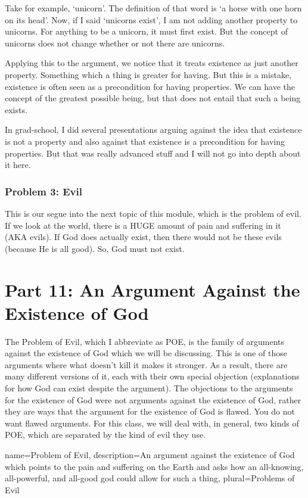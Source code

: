 Take for example, ‘unicorn’. The definition of that word is ‘a horse with one horn on its head’. Now, if I said ‘unicorns exist’, I am not adding another property to unicorns. For anything to be a unicorn, it must first exist. But the concept of unicorns does not change whether or not there are unicorns.

Applying this to the argument, we notice that it treats existence as just another property. Something which a thing is greater for having. But this is a mistake, existence is often seen as a precondition for having properties. We can have the concept of the greatest possible being, but that does not entail that such a being exists.

In grad-school, I did several presentations arguing against the idea that existence is not a property and also against that existence is a precondition for having properties. But that was really advanced stuff and I will not go into depth about it here.

\subsection{Problem 3: Evil}
This is our segue into the next topic of this module, which is the problem of evil. If we look at the world, there is a HUGE amount of pain and suffering in it (AKA evils). If God does actually exist, then there would not be these evils (because He is all good). So, God must not exist. 

\chapter{Part 11: An Argument Against the Existence of God}

The \gls{Problem of Evil}, which I abbreviate as POE, is the family of arguments against the existence of God which we will be discussing. This is one of those arguments where what doesn't kill it makes it stronger. As a result, there are many different versions of it, each with their own special objection (explanations for how God can exist despite the argument). The objections to the arguments for the existence of God were not arguments against the existence of God, rather they are ways that the argument for the existence of God is flawed. You do not want flawed arguments. For this class, we will deal with, in general, two kinds of POE, which are separated by the kind of evil they use. 

{
name=Problem of Evil,
description={An argument against the existence of God which points to the pain and suffering on the Earth and asks how an all-knowing, all-powerful, and all-good god could allow for such a thing},
plural=Problems of Evil
}


